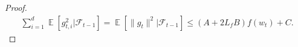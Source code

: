 \documentclass{article} %
\DeclareMathOperator{\Expect}{\mathbb{E}}
\begin{document}
\begin{proof}
\begin{align*}
\sum_{i=1}^{d}\Expect[g_{t,i}^{2}|\mathscr{F}_{t-1}]=\Expect[\|g_{t}\|^{2}|\mathscr{F}_{t-1}]\le (A+2L_{f}B)f(w_{t})+C.
\end{align*}

\end{proof}
\end{document}
